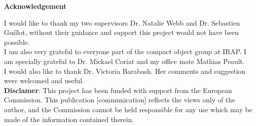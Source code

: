 \thispagestyle{empty}
\begin{Large}
\textbf{Acknowledgement}
\end{Large}
\bigbreak

I would like to thank my two supervisors Dr. Natalie Webb and Dr. Sebastien Guillot, without their guidance and support this project would not have been possible. \\

I am also very grateful to everyone part of the compact object group at IRAP. I am specially grateful to Dr. Mickael Coriat and my office mate Mathias Peault.\\ 

I would also like to thank Dr. Victoria Barabash. Her comments and suggestion were welcomed and useful. \\

\textbf{Disclamer}: This project has been funded with support from the European Commission. This publication [communication] reflects the views only of the author, and the Commission cannot be held responsible for any use which may be made of the information contained therein.




